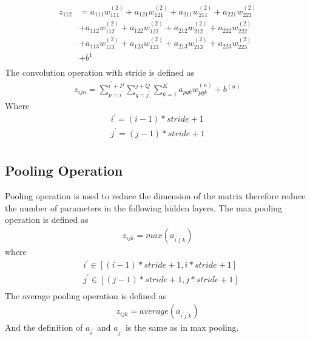 \documentclass[a4paper]{article}
\begin{document}
\begin{align*}
z_{112} & = a_{111} w_{111}^{(2)} + a_{121} w_{121}^{(2)} + a_{211} w_{211}^{(2)} + a_{221} w_{221}^{(2)}\\
		& + a_{112} w_{112}^{(2)} + a_{122} w_{122}^{(2)} + a_{212} w_{212}^{(2)} + a_{222} w_{222}^{(2)}\\	
		& + a_{113} w_{113}^{(2)} + a_{123} w_{123}^{(2)} + a_{213} w_{213}^{(2)} + a_{223} w_{223}^{(2)}\\	
		& + b^{1}\\
\end{align*}
The convolution operation with stride is defined as \\
\begin{align*}
	z_{ijn} = \sum_{p=i^{'}}^{i^{'}+P} \sum_{q=j^{'}}^{j+Q} \sum_{k=1}^{K} a_{pqk} w_{pqk}^{(n)} + b^{(n)}
\end{align*}
Where 
\begin{align*}
	i^{'} = (i-1)*stride +1\\
	j^{'} = (j-1)*stride +1\\
\end{align*}
\subsection{Pooling Operation}
Pooling operation is used to reduce the dimension of the matrix therefore reduce the number of parameters in the following hidden layers. The max pooling operation is defined as
\begin{align*}
	z_{ijk} = max (a_{i^{'}j^{'}k})
\end{align*}
where
\begin{align*}
	&i^{'} \in [(i-1)*stride +1, i*stride +1] \\
	&j^{'} \in [(j-1)*stride +1, j*stride +1] \\
\end{align*}
The average pooling operation is defined as
\begin{align*}
	z_{ijk} = average (a_{i^{'}j^{'}k})
\end{align*}
And the definition of $a_{i^{'}}$ and $a_{j^{'}}$ is the same as in max pooling.
\end{document}
